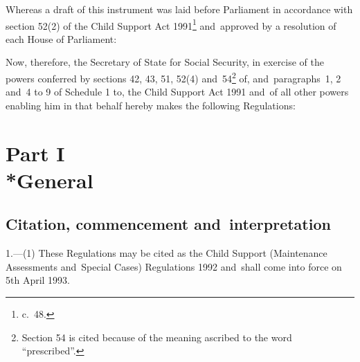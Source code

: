 \documentclass[12pt,a4paper]{article}
\title{\regstitle}
\author{S.I. 1992 No. 1815}
\date{Made 20th July 1992\\Coming into force 5th April 1993}
\begin{document}
\maketitle


\medskip

\noindent
 Whereas a draft of this instrument was laid before Parliament in accordance with section 52(2) of the Child Support Act 1991\footnote{ c.~48.} and~approved by a resolution of each House of Parliament:

Now, therefore, the Secretary of State for Social Security, in exercise of the powers conferred by sections 42, 43, 51, 52(4) and~54\footnote{\frenchspacing Section 54 is cited because of the meaning ascribed to the word “prescribed”.} of, and~paragraphs~1, 2 and~4 to 9 of Schedule 1 to, the Child Support Act 1991 and~of all other powers enabling him in that behalf hereby makes the following Regulations: 

{\sloppy

\tableofcontents

}

\setcounter{secnumdepth}{-2}

\section[Part I --- General]{Part I\\*General}

\renewcommand\parthead{--- Part I}

\subsection[1. Citation, commencement and~interpretation]{Citation, commencement and~interpretation}

1.—(1) These Regulations may be cited as the Child Support (Maintenance Assessments and~Special Cases) Regulations 1992 and~shall come into force on 5th April 1993.
\end{document}
